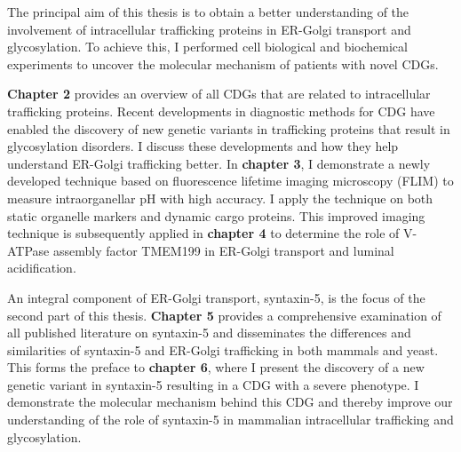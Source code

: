 The principal aim of this thesis is to obtain a better understanding of the involvement of intracellular trafficking proteins in ER-Golgi transport and glycosylation. To achieve this, I performed cell biological and biochemical experiments to uncover the molecular mechanism of patients with novel CDGs.

\textbf{Chapter 2} provides an overview of all CDGs that are related to intracellular trafficking proteins. Recent developments in diagnostic methods for CDG have enabled the discovery of new genetic variants in trafficking proteins that result in glycosylation disorders. I discuss these developments and how they help understand ER-Golgi trafficking better. In \textbf{chapter 3}, I demonstrate a newly developed technique based on fluorescence lifetime imaging microscopy (FLIM) to measure intraorganellar pH with high accuracy. I apply the technique on both static organelle markers and dynamic cargo proteins. This improved imaging technique is subsequently applied in \textbf{chapter 4} to determine the role of V-ATPase assembly factor TMEM199 in ER-Golgi transport and luminal acidification.

An integral component of ER-Golgi transport, syntaxin-5, is the focus of the second part of this thesis. \textbf{Chapter 5} provides a comprehensive examination of all published literature on syntaxin-5 and disseminates the differences and similarities of syntaxin-5 and ER-Golgi trafficking in both mammals and yeast. This forms the preface to \textbf{chapter 6}, where I present the discovery of a new genetic variant in syntaxin-5 resulting in a CDG with a severe phenotype. I demonstrate the molecular mechanism behind this CDG and thereby improve our understanding of the role of syntaxin-5 in mammalian intracellular trafficking and glycosylation.

